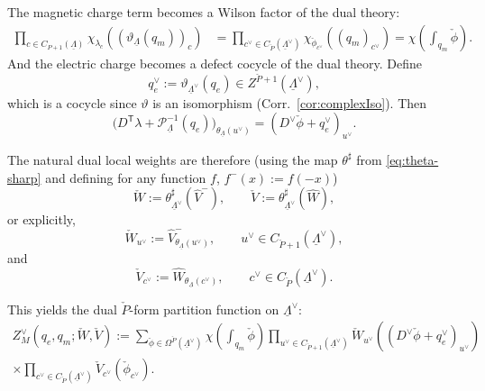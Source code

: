 \documentclass[dvipsnames,a4paper]{article}
\numberwithin{equation}{section}
\theoremstyle{definition}
\theoremstyle{remark}
\begin{document}
The magnetic charge term becomes a Wilson factor of the dual theory:
\begin{align}
	\prod_{c\in C_{P+1}(\underline\Lambda)}
	\chi_{\lambda_c} \left((\vartheta_{\underline\Lambda}(q_m))_c\right)
	&=
	\prod_{c^\vee\in C_{\check P}(\underline\Lambda^\vee)}
	\chi_{\check\phi_{c^\vee}} \left((q_m)_{c^\vee}\right)
	=
	\chi \left(\int_{q_m}\check\phi\right).
	\label{eq:KW-magnetic-to-dual-Wilson}
\end{align}
And the electric charge becomes a defect cocycle of the dual theory. Define
\begin{equation}
	q_e^\vee := \vartheta_{\underline\Lambda^\vee}(q_e)\in Z^{\check P+1}(\underline\Lambda^\vee),
\end{equation}
which is a cocycle since $\vartheta$ is an isomorphism (Corr.~\ref{cor:complexIso}). Then
\begin{equation}
	\bigl(D^{\mathsf T}\lambda+\mathcal P_{\underline\Lambda}^{-1}(q_e)\bigr)_{\theta_{\underline\Lambda}(u^\vee)}
	=
	\left(D^\vee\check\phi+q_e^\vee\right)_{u^\vee}.
	\label{eq:KW-electric-to-dual-defect}
\end{equation}

The natural dual local weights are therefore (using the map $\theta^\sharp$ from \eqref{eq:theta-sharp} and defining for any function $f$, $f^{-}(x):=f(-x)$)
\begin{equation}
	\check W := \theta_{\underline\Lambda^\vee}^\sharp(\widehat V^{-}),
	\qquad
	\check V := \theta_{\underline\Lambda^\vee}^\sharp(\widehat W),
\end{equation}
or explicitly,
\begin{equation}
	\check W_{u^\vee}
	:=
	\widehat V^{-}_{\theta_{\underline\Lambda}(u^\vee)},
	\qquad
	u^\vee\in C_{\check P+1}(\underline\Lambda^\vee),
	\label{eq:KW-dual-W}
\end{equation}
and
\begin{equation}
	\check V_{c^\vee}
	:=
	\widehat W_{\theta_{\underline\Lambda}(c^\vee)},
	\qquad
	c^\vee\in C_{\check P}(\underline\Lambda^\vee).
	\label{eq:KW-dual-V}
\end{equation}

This yields the dual \(\check P\)-form partition function on \(\underline\Lambda^\vee\):
\begin{equation}
	\begin{aligned}
		Z_M^\vee(q_e,q_m;\check W,\check V)
		:=
		\sum_{\check\phi\in \Omega^{\check P}(\underline\Lambda^\vee)}
		\chi \left(\int_{q_m}\check\phi\right)
		\prod_{u^\vee\in C_{\check P+1}(\underline\Lambda^\vee)}
		\check W_{u^\vee} \left((D^\vee\check\phi+q_e^\vee)_{u^\vee}\right)
		\\
		\times
		\prod_{c^\vee\in C_{\check P}(\underline\Lambda^\vee)}
		\check V_{c^\vee}(\check\phi_{c^\vee}).
	\end{aligned}
	\label{eq:KW-dual-raw-fixed-charge}
\end{equation}
\end{document}
